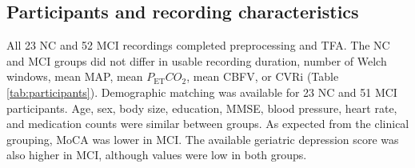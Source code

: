 \documentclass[12pt]{article}
\newcommand{\PETCOtwo}{P_{\mathrm{ET}}CO_2}
\begin{document}
\subsection{Participants and recording characteristics}

All 23 NC and 52 MCI recordings completed preprocessing and TFA. The NC and
MCI groups did not differ in usable recording duration, number of Welch
windows, mean MAP, mean $\PETCOtwo$, mean CBFV, or CVRi (Table
\ref{tab:participants}). Demographic matching was available for 23 NC and 51
MCI participants. Age, sex, body size, education, MMSE, blood pressure, heart
rate, and medication counts were similar between groups. As expected from the
clinical grouping, MoCA was lower in MCI. The available geriatric depression
score was also higher in MCI, although values were low in both groups.
\end{document}
